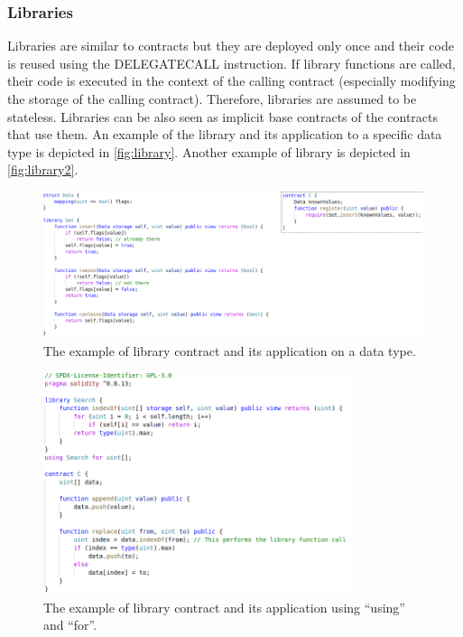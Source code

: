 \subsubsection{Libraries}\label{sec:libs}
Libraries are similar to contracts but they are deployed only once and their code is reused using the DELEGATECALL instruction.
If library functions are called, their code is executed in the context of the calling contract (especially modifying the storage of the calling contract).
Therefore, libraries are assumed to be stateless.
Libraries can be also seen as implicit base contracts of the contracts that use them.
An example of the library and its application to a specific data type is depicted in \autoref{fig:library}. 
Another example of library is depicted in \autoref{fig:library2}.


\begin{figure}[bt]
	\begin{center}
		\includegraphics[width=0.99\textwidth]{./figs/library.png }
		\caption{The example of library contract and its application on a data type.}		
		\label{fig:library}
	\end{center}	
\end{figure}

\begin{figure}[bt]
	\begin{center}
		\includegraphics[width=0.8\textwidth]{./figs/library2.png }
		\caption{The example of library contract and its application using ``using'' and ``for''.}		
		\label{fig:library2}
	\end{center}	
\end{figure}



